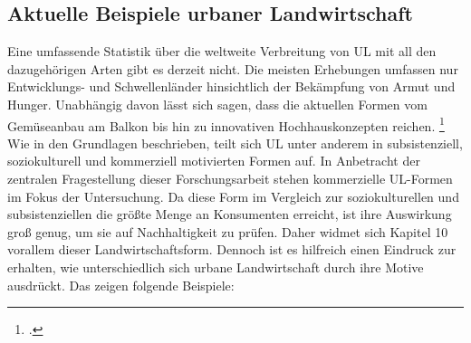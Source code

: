 \documentclass{scrartcl}
\begin{document}
\subsection{Aktuelle Beispiele urbaner Landwirtschaft}





Eine umfassende Statistik über die weltweite Verbreitung von UL mit all den dazugehörigen Arten gibt es derzeit nicht. Die meisten Erhebungen umfassen nur Entwicklungs- und Schwellenländer hinsichtlich der Bekämpfung von Armut und Hunger. Unabhängig davon lässt sich sagen, dass die aktuellen Formen vom Gemüseanbau am Balkon bis hin zu innovativen Hochhauskonzepten reichen. \footcites[Vgl.][S.24]{Berges2014UrbaneStadt}[S.268]{Zezza2010UrbanCountries}[S.14]{Al-Kodmany2018TheCity} Wie in den Grundlagen beschrieben, teilt sich UL unter anderem in subsistenziell, soziokulturell und kommerziell motivierten Formen auf. In Anbetracht der zentralen Fragestellung dieser Forschungsarbeit stehen kommerzielle UL-Formen im Fokus der Untersuchung. Da diese Form im Vergleich zur soziokulturellen und subsistenziellen die größte Menge an Konsumenten erreicht, ist ihre Auswirkung groß genug, um sie auf Nachhaltigkeit zu prüfen. Daher widmet sich Kapitel 10 vorallem dieser Landwirtschaftsform. Dennoch ist es hilfreich einen Eindruck zur erhalten, wie unterschiedlich sich urbane Landwirtschaft durch ihre Motive ausdrückt. Das zeigen folgende Beispiele:
\end{document}
